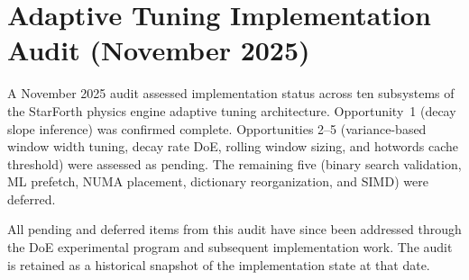 
\section*{Adaptive Tuning Implementation Audit (November 2025)}

A November 2025 audit assessed implementation status across ten subsystems of
the StarForth physics engine adaptive tuning architecture. Opportunity~1
(decay slope inference) was confirmed complete. Opportunities 2--5 (variance-based
window width tuning, decay rate DoE, rolling window sizing, and hotwords cache
threshold) were assessed as pending. The remaining five (binary search validation,
ML prefetch, NUMA placement, dictionary reorganization, and SIMD) were deferred.

All pending and deferred items from this audit have since been addressed through
the DoE experimental program and subsequent implementation work. The audit is
retained as a historical snapshot of the implementation state at that date.
